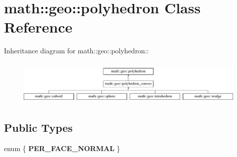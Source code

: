 \hypertarget{classmath_1_1geo_1_1polyhedron}{
\section{math::geo::polyhedron Class Reference}
\label{classmath_1_1geo_1_1polyhedron}
}
Inheritance diagram for math::geo::polyhedron::\begin{figure}[H]
\begin{center}
\leavevmode
\includegraphics[height=2.19895cm]{classmath_1_1geo_1_1polyhedron}
\end{center}
\end{figure}
\subsection*{Public Types}
\begin{DoxyCompactItemize}
\item 
enum \{ {\bfseries PER\_\-FACE\_\-NORMAL}
 \}
\end{DoxyCompactItemize}
